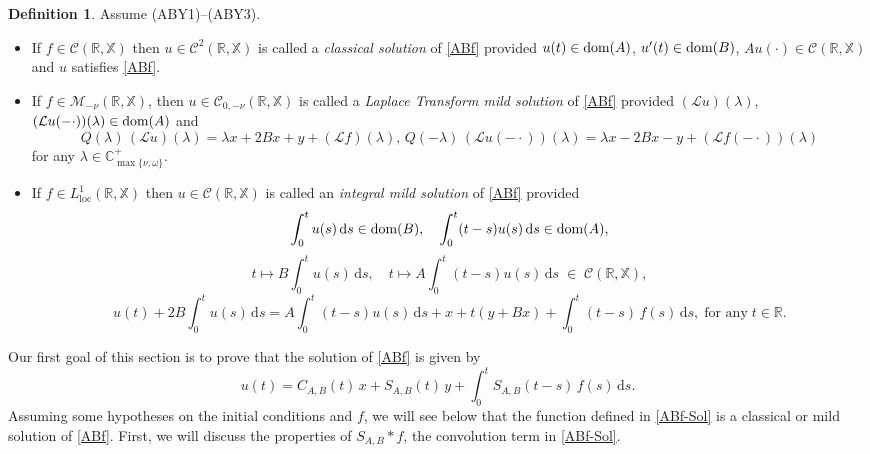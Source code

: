 \documentclass[11pt]{amsart}
\numberwithin{equation}{section}
\newcommand{\RR}{{\mathbb R}}
\newcommand{\rmd}{{\mathrm{d}}}
\theoremstyle{remark}
\theoremstyle{definition}
\newtheorem{definition}[theorem]{Definition}
\newcommand\bX{{\mathbb X}}
\newcommand{\dom}{\text{\rm{dom}}}
\begin{document}
\begin{definition}\label{d5.1} Assume \textnormal{(ABY1)--(ABY3)}. 
	\begin{itemize}
		\item[(i)] If $f \in \mathcal{C}(\mathbb{R}, \bX)$ then $u \in \mathcal{C}^2(\mathbb{R}, \bX)$ is called a \emph{classical solution} of \eqref{ABf} provided $u(t) \in \dom(A)$, $u'(t) \in \dom(B)$, $Au(\cdot) \in \mathcal{C}(\mathbb{R}, \bX)$ and $u$ satisfies \eqref{ABf}.
		\item[(ii)] If $f\in\mathcal{M}_{-\nu}(\mathbb{R},\bX)$, then $u \in \mathcal{C}_{0,-\nu}(\mathbb{R}, \bX)$ is called a \emph{Laplace Transform mild solution} of \eqref{ABf} provided $(\mathcal{L}u)(\lambda)$, $(\mathcal{L}u(-\cdot))(\lambda) \in \dom(A)$ and
		\begin{equation}\label{ABf-LTm} 
			Q(\lambda)\,(\mathcal{L}u)(\lambda) = \lambda x + 2Bx + y + (\mathcal{L}f)(\lambda),\,
			Q(-\lambda)\,(\mathcal{L}u(-\cdot))(\lambda) = \lambda x - 2Bx - y + (\mathcal{L}f(-\cdot))(\lambda)
		\end{equation}
		for any $\lambda \in \mathbb{C}^+_{\max\{\nu, \omega\}}$.
		\item[(iii)] If $f \in L^1_{\mathrm{loc}}(\mathbb{R}, \bX)$ then $u \in \mathcal{C}(\mathbb{R}, \bX)$ is called an \emph{integral mild solution} of \eqref{ABf} provided
		\begin{equation}\label{ABf-Im-1}  
			\int_0^t u(s)\,\rmd s \in \dom(B), \quad \int_0^t (t-s)u(s)\,\rmd s \in \dom(A),
		\end{equation}
		\begin{equation}\label{ABf-Im-2}
			t \mapsto B\int_0^t u(s)\,\rmd s, \quad t \mapsto A\int_0^t (t-s)u(s)\,\rmd s \;\in\; \mathcal{C}(\mathbb{R}, \bX),
		\end{equation}
		\begin{equation}\label{ABf-Im-3}   
			u(t) + 2B\int_0^t u(s)\,\rmd s = A\int_0^t (t-s)u(s)\,\rmd s + x
			+ t(y + Bx) + \int_0^t (t-s)\,f(s)\,\rmd s,\;\mbox{for any}\;t\in\RR.
		\end{equation}
	\end{itemize}	
\end{definition}	
Our first goal of this section is to prove that the solution of \eqref{ABf} is given by
\begin{equation}\label{ABf-Sol} 
	u(t) = C_{A,B}(t)\,x + S_{A,B}(t)\,y + \int_0^t S_{A,B}(t-s)\,f(s)\,\rmd s.
\end{equation}
Assuming some hypotheses on the initial conditions and $f$, we will see below that the function defined in \eqref{ABf-Sol} is a classical or mild solution of \eqref{ABf}. First, we will discuss the properties of $S_{A,B} * f$, the convolution term in \eqref{ABf-Sol}.
\end{document}
